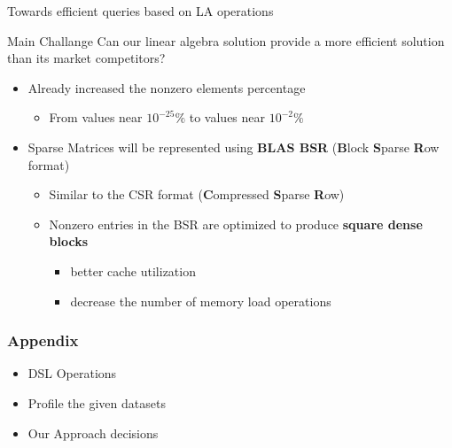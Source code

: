 \documentclass{beamer}
\begin{document}
\begin{frame}{Towards efficient queries based on LA operations}

\begin{block}{Main Challange}
Can our linear algebra solution provide a more efficient solution than its market competitors?
\end{block}

\begin{itemize}
    \item{Already increased the nonzero elements percentage
    \begin{itemize}
        \item From values near 
 $10^{-25}\%$ to values near  $10^{-2}\%$
    
    \end{itemize}
    
    }
    \vspace{0.5cm}
    \item Sparse Matrices will be represented using \textbf{BLAS BSR} {\small(\textbf{B}lock \textbf{S}parse \textbf{R}ow format) }
    \begin{itemize}
        \item Similar to the CSR format (\textbf{C}ompressed \textbf{S}parse \textbf{R}ow)
        \item Nonzero entries in the BSR are optimized to produce \textbf{square dense blocks} 
        \begin{itemize}
            \item better cache utilization
            \item decrease the number of memory load operations
        \end{itemize}
    \end{itemize}
\end{itemize}
    
\end{frame}



\begin{frame}
  \titlepage
\end{frame}

\begin{frame}
\frametitle{Appendix}
\begin{itemize}
    \item DSL Operations
    \item Profile the given datasets
    \item Our Approach decisions
\end{itemize}
\end{frame}
\end{document}

